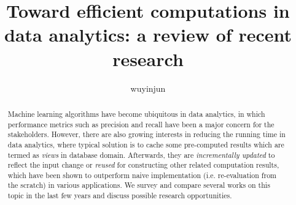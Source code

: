 \documentclass{article}
\title{Toward efficient computations in data analytics: a review of recent research}
\author{wuyinjun }
\date{}
\theoremstyle{definition}
\begin{document}
\maketitle

\begin{abstract}
Machine learning algorithms have become ubiquitous in data analytics, in which performance metrics such as precision and recall have been a major concern for the stakeholders. However, there are also growing interests in reducing the running time in data analytics, where typical solution is to cache some pre-computed results which are termed as \textit{views} in database domain. Afterwards, they are {\em incrementally updated} to reflect the input change or {\em reused} for constructing other related computation results, which have been shown to outperform naive implementation (i.e. re-evaluation from the scratch) in various applications. We survey and compare several works on this topic in the last few years and discuss possible research opportunities.
    
\end{abstract}












\newpage



\end{document}
